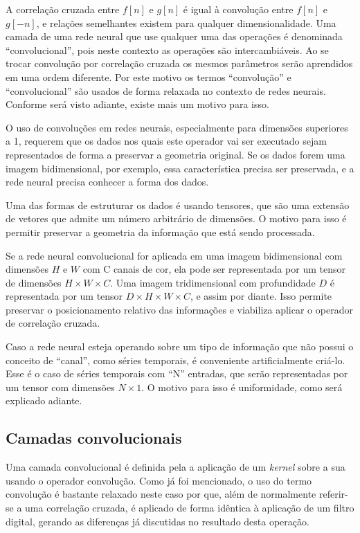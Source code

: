 A correlação cruzada entre $f[n]$ e $g[n]$
é igual à convolução entre $f[n]$ e $g[-n]$, e relações semelhantes existem
para qualquer dimensionalidade. Uma camada de uma rede
neural que use qualquer uma das operações é denominada “convolucional”,
pois neste contexto as operações são intercambiáveis. Ao se trocar convolução
por correlação
cruzada os mesmos parâmetros serão aprendidos em uma ordem diferente.
Por este motivo os termos ``convolução'' e ``convolucional'' são usados de forma
relaxada no contexto de redes neurais. Conforme será visto adiante, existe
mais um motivo para isso.

O uso de convoluções em redes neurais, especialmente para dimensões superiores
a 1, requerem que os dados nos quais este operador vai ser executado sejam
representados de forma a preservar a geometria original. Se os dados forem uma
imagem bidimensional, por exemplo, essa característica precisa ser preservada,
e a rede neural precisa conhecer a forma dos dados.

Uma das formas de estruturar os dados é usando tensores, que são uma
extensão de
vetores que admite um número arbitrário de dimensões. O motivo para isso é
permitir preservar a geometria da informação que está sendo processada.

Se a rede neural convolucional for aplicada em uma
imagem bidimensional com dimensões $H$ e $W$ com C canais de cor, ela pode ser
representada por um tensor de dimensões $H \times W \times C$. Uma imagem
tridimensional com profundidade $D$ é representada por um tensor
$D \times H \times W \times C$, e assim por
diante. Isso permite preservar o posicionamento relativo das informações
e viabiliza aplicar o operador de correlação cruzada.

Caso a rede neural esteja operando sobre um tipo de informação que não possui o
conceito de “canal”, como séries temporais, é conveniente artificialmente
criá-lo. Esse é o caso de séries temporais com “N” entradas, que serão
representadas por um tensor com dimensões $N\times1$. O motivo para isso é
uniformidade, como será explicado adiante.

\subsection{Camadas convolucionais}
Uma camada convolucional é definida pela a aplicação de um \emph{kernel} sobre
a sua usando o operador convolução. Como já foi mencionado,
o uso do termo convolução
é bastante relaxado neste caso por que, além de normalmente referir-se a
uma correlação cruzada, é aplicado de forma idêntica à aplicação de um filtro
digital, gerando as diferenças já discutidas no resultado desta operação.

